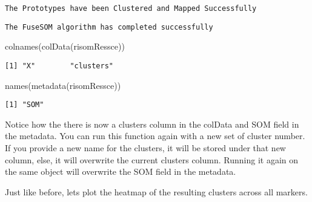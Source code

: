 \documentclass[
  letterpaper,
  DIV=11,
  numbers=noendperiod]{scrreprt}
\newenvironment{Shaded}{\begin{snugshade}}{\end{snugshade}}
\newcommand{\AttributeTok}[1]{\textcolor[rgb]{0.40,0.45,0.13}{#1}}
\newcommand{\CommentTok}[1]{\textcolor[rgb]{0.37,0.37,0.37}{#1}}
\newcommand{\ConstantTok}[1]{\textcolor[rgb]{0.56,0.35,0.01}{#1}}
\newcommand{\FunctionTok}[1]{\textcolor[rgb]{0.28,0.35,0.67}{#1}}
\newcommand{\NormalTok}[1]{\textcolor[rgb]{0.00,0.23,0.31}{#1}}
\newcommand{\OtherTok}[1]{\textcolor[rgb]{0.00,0.23,0.31}{#1}}
\newcommand{\SpecialCharTok}[1]{\textcolor[rgb]{0.37,0.37,0.37}{#1}}
\begin{document}
\begin{verbatim}
The Prototypes have been Clustered and Mapped Successfully
\end{verbatim}

\begin{verbatim}
The FuseSOM algorithm has completed successfully
\end{verbatim}

\begin{Shaded}
\begin{Highlighting}[]
\FunctionTok{colnames}\NormalTok{(}\FunctionTok{colData}\NormalTok{(risomRessce))}
\end{Highlighting}
\end{Shaded}

\begin{verbatim}
[1] "X"        "clusters"
\end{verbatim}

\begin{Shaded}
\begin{Highlighting}[]
\FunctionTok{names}\NormalTok{(}\FunctionTok{metadata}\NormalTok{(risomRessce))}
\end{Highlighting}
\end{Shaded}

\begin{verbatim}
[1] "SOM"
\end{verbatim}

Notice how the there is now a clusters column in the colData and SOM
field in the metadata. You can run this function again with a new set of
cluster number. If you provide a new name for the clusters, it will be
stored under that new column, else, it will overwrite the current
clusters column. Running it again on the same object will overwrite the
SOM field in the metadata.

Just like before, lets plot the heatmap of the resulting clusters across
all markers.

\begin{Shaded}
\end{Shaded}
\end{document}
